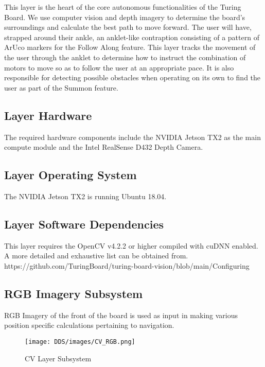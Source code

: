 This layer is the heart of the core autonomous functionalities of the Turing Board. We use computer
vision and depth imagery to determine the board’s surroundings and calculate the best path to move
forward. The user will have, strapped around their ankle, an anklet-like contraption consisting of a
pattern of ArUco markers for the Follow Along feature. This layer tracks the movement of the user
through the anklet to determine how to instruct the combination of motors to move so as to follow the
user at an appropriate pace. It is also responsible for detecting possible obstacles when operating on its
own to find the user as part of the Summon feature.
\subsection{Layer Hardware}
The required hardware components include the NVIDIA Jetson TX2 as the main compute module and the Intel RealSense  D432 Depth Camera.

\subsection{Layer Operating System}
The NVIDIA Jetson TX2 is running Ubuntu 18.04. 

\subsection{Layer Software Dependencies}
This layer requires the OpenCV v4.2.2 or higher compiled with cuDNN enabled. A more detailed and exhaustive list can be obtained from. https://github.com/TuringBoard/turing-board-vision/blob/main/Configuring%

\subsection{RGB Imagery Subsystem
}
RGB Imagery of the front of the board is used as input in making various position specific calculations pertaining to navigation.

\begin{figure}[h!]
	\centering
 	\texttt{[image: DDS/images/CV\_RGB.png]} %
 \caption{CV Layer Subsystem} %
\end{figure}

